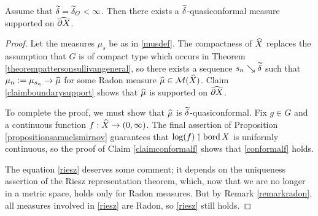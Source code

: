 \begin{lemma}
\label{lemmapattersonsullivannonstandard}
Assume that $\widetilde\delta = \widetilde\delta_G < \infty$. Then there exists a $\widetilde\delta$-quasiconformal measure supported on $\widehat{\partial X}$.
\end{lemma}
\begin{proof}
Let the measures $\mu_s$ be as in \eqref{musdef}. The compactness of $\widehat X$ replaces the assumption that $G$ is of compact type which occurs in Theorem \ref{theorempattersonsullivangeneral}, so there exists a sequence $s_n\searrow\widetilde\delta$ such that $\mu_n := \mu_{s_n}\to \widehat\mu$ for some Radon measure $\widehat\mu\in \mathcal M(\widehat X)$. Claim \ref{claimboundarysupport} shows that $\widehat\mu$ is supported on $\widehat{\partial X}$.

To complete the proof, we must show that $\widehat\mu$ is $\widetilde\delta$-quasiconformal. Fix $g\in G$ and a continuous function $f:\widehat X\to (0,\infty)$. The final assertion of Proposition \ref{propositionsamuelsmirnov} guarantees that $\log(f) \upharpoonleft \operatorname{bord} X$ is uniformly continuous, so the proof of Claim \ref{claimconformalf} shows that \eqref{conformalf} holds.

The equation \eqref{riesz} deserves some comment; it depends on the uniqueness assertion of the Riesz representation theorem, which, now that we are no longer in a metric space, holds only for Radon measures. But by Remark \ref{remarkradon}, all measures involved in \eqref{riesz} are Radon, so \eqref{riesz} still holds.
\end{proof}


